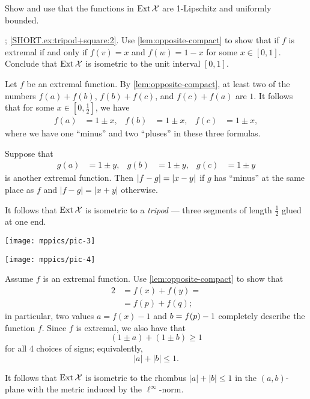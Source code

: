 Show and use that the functions in $\mathop{\rm Ext}\nolimits\mathcal{X}$ are 1-Lipschitz and uniformly bounded.

\parbf{\ref{ex:tripod+square}}; \ref{SHORT.ex:tripod+square:2}.
Use \ref{lem:opposite-compact} to show that if $f$ is extremal if and only if $f(v)=x$ and $f(w)=1-x$ for some $x\in [0,1]$.
Conclude that $\mathop{\rm Ext}\nolimits\mathcal{X}$ is isometric to the unit interval $[0,1]$.

Let $f$ be an extremal function.
By \ref{lem:opposite-compact}, at least two of the numbers $f(a)+f(b)$, $f(b)+f(c)$, and $f(c)+f(a)$ are $1$.
It follows that for some $x\in[0,\tfrac12]$, we have 
\begin{align*}
f(a)&=1\pm x,&
f(b)&=1\pm x,&
f(c)&=1\pm x,
\end{align*}
where we have one ``minus'' and two ``pluses'' in these three formulas.

Suppose that
\begin{align*}
g(a)&=1\pm y,& g(b)&=1\pm y,& g(c)&=1\pm y
\end{align*}
is another extremal function.
Then $|f-g|\z=|x-y|$ if $g$ has ``minus'' at the same place as $f$ and $|f-g|=|x+y|$ otherwise.

It follows that $\mathop{\rm Ext}\nolimits\mathcal{X}$ is isometric to a \textit{tripod} --- three segments of length $\tfrac12$ glued at one end.

\begin{Figure}
\begin{minipage}{.48\textwidth}
\centering
\texttt{[image: mppics/pic-3]}
\end{minipage}\hfill
\begin{minipage}{.48\textwidth}
\centering
\texttt{[image: mppics/pic-4]}
\end{minipage}
\vskip-4mm
\end{Figure}

Assume $f$ is an extremal function.
Use \ref{lem:opposite-compact} to show that
\begin{align*}
2&=f(x)+f(y)=
\\
&=f(p)+f(q);
\end{align*}
in particular, two values $a=f(x)-1$ and $b\z=f(p)-1$ completely describe the function $f$.
Since $f$ is extremal, we also have that 
\[(1\pm a)+(1\pm b)\ge 1\]
for all 4 choices of signs;
equivalently, 
\[|a|+|b|\le 1.\]

It follows that $\mathop{\rm Ext}\nolimits\mathcal{X}$ is isometric to the rhombus $|a|+|b|\le 1$ in the $(a,b)$-plane with the metric induced by the $\ell^\infty$-norm.

